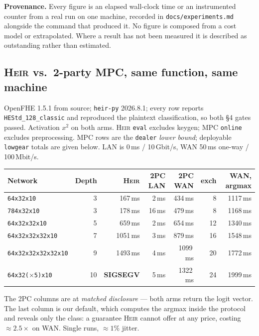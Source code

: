 \documentclass[10pt]{article}
\newcommand{\heir}{\textsc{Heir}}
\begin{document}
\textbf{Provenance.} Every figure is an elapsed wall-clock time or an
instrumented counter from a real run on one machine, recorded in
\texttt{docs/experiments.md} alongside the command that produced it. No figure
is composed from a cost model or extrapolated. Where a result has not been
measured it is described as outstanding rather than estimated.

\subsection{\heir{} vs.\ 2-party MPC, same function, same machine}

OpenFHE 1.5.1 from source; \texttt{heir-py} 2026.8.1; every row reports
\texttt{HEStd\_128\_classic} and reproduced the plaintext classification, so
both §4 gates passed. Activation $x^2$ on both arms. \heir{} \texttt{eval}
excludes keygen; MPC \texttt{online} excludes preprocessing. MPC rows are the
\texttt{dealer} \emph{lower bound}; deployable \texttt{lowgear} totals are given
below. LAN is 0\,ms / 10\,Gbit/s, WAN 50\,ms one-way / 100\,Mbit/s.

\begin{center}\small
\begin{tabular}{@{}lrrrrrr@{}}
\toprule
\textbf{Network} & \textbf{Depth} & \textbf{\heir{}} & \textbf{2PC LAN} & \textbf{2PC WAN} & \textbf{exch} & \textbf{WAN, argmax} \\
\midrule
\texttt{64x32x10}            & 3  & 167\,ms & 2\,ms & 434\,ms & 8  & 1117\,ms \\
\texttt{784x32x10}           & 3  & 178\,ms & 16\,ms & 479\,ms & 8  & 1168\,ms \\
\texttt{64x32x32x10}         & 5  & 659\,ms & 2\,ms & 654\,ms & 12 & 1340\,ms \\
\texttt{64x32x32x32x10}      & 7  & 1051\,ms & 3\,ms & 879\,ms & 16 & 1548\,ms \\
\texttt{64x32x32x32x32x10}   & 9  & 1493\,ms & 4\,ms & 1099\,ms & 20 & 1772\,ms \\
\texttt{64x32($\times$5)x10} & 10 & \textbf{SIGSEGV} & 5\,ms & 1322\,ms & 24 & 1999\,ms \\
\bottomrule
\end{tabular}
\end{center}

\noindent The 2PC columns are at \emph{matched disclosure} --- both arms return
the logit vector. The last column is our default, which computes the argmax
inside the protocol and reveals only the class: a guarantee \heir{} cannot offer
at any price, costing ${\approx}2.5\times$ on WAN. Single runs, ${\approx}1\%$
jitter.
\end{document}
